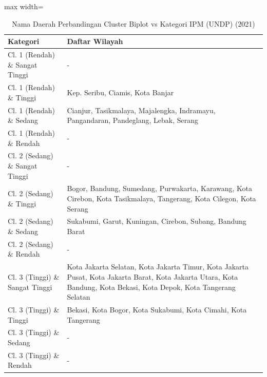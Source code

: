 \begin{table}[H]
\centering
\caption{Nama Daerah Perbandingan Cluster Biplot vs Kategori IPM (UNDP) (2021)} \label{tab:appcrossname2021}
\begin{adjustbox}{max width=\textwidth}
\begin{tabular}{|p{4cm}|p{10cm}|}
\hline
\textbf{Kategori} & \textbf{Daftar Wilayah} \\
\hline
Cl. 1 (Rendah) \& Sangat Tinggi & - \\
\hline
Cl. 1 (Rendah) \& Tinggi & Kep. Seribu, Ciamis, Kota Banjar \\
\hline
Cl. 1 (Rendah) \& Sedang & Cianjur, Tasikmalaya, Majalengka, Indramayu, Pangandaran, Pandeglang, Lebak, Serang \\
\hline
Cl. 1 (Rendah) \& Rendah & - \\
\hline
Cl. 2 (Sedang) \& Sangat Tinggi & - \\
\hline
Cl. 2 (Sedang) \& Tinggi & Bogor, Bandung, Sumedang, Purwakarta, Karawang, Kota Cirebon, Kota Tasikmalaya, Tangerang, Kota Cilegon, Kota Serang \\
\hline
Cl. 2 (Sedang) \& Sedang & Sukabumi, Garut, Kuningan, Cirebon, Subang, Bandung Barat \\
\hline
Cl. 2 (Sedang) \& Rendah & - \\
\hline
Cl. 3 (Tinggi) \& Sangat Tinggi & Kota Jakarta Selatan, Kota Jakarta Timur, Kota Jakarta Pusat, Kota Jakarta Barat, Kota Jakarta Utara, Kota Bandung, Kota Bekasi, Kota Depok, Kota Tangerang Selatan \\
\hline
Cl. 3 (Tinggi) \& Tinggi & Bekasi, Kota Bogor, Kota Sukabumi, Kota Cimahi, Kota Tangerang \\
\hline
Cl. 3 (Tinggi) \& Sedang & - \\
\hline
Cl. 3 (Tinggi) \& Rendah & - \\
\hline
\end{tabular}
\end{adjustbox}
\end{table}
